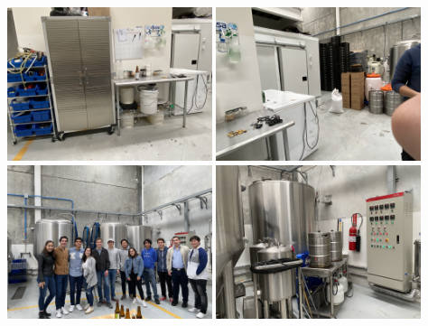 \documentclass{article}
\begin{document}
\includegraphics[width=6cm]{./img/06.JPG}
\includegraphics[width=6cm]{./img/07.JPG}
\includegraphics[width=6cm]{./img/08.JPG}
\includegraphics[width=6cm]{./img/10.JPG}



\end{document}
